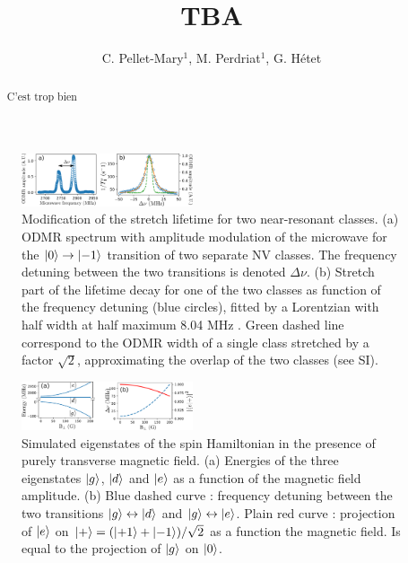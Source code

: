 \documentclass[preprintnumbers,amsmath,amssymb,superscriptaddress,twocolumn,showpacs]{revtex4-1}
\begin{document}
\title{TBA}

\author{C. Pellet-Mary$^1$, M. Perdriat$^1$, G. H\'etet} 


\begin{abstract}
C'est trop bien
\end{abstract}

\maketitle

\begin{figure}
\includegraphics[width=0.45\textwidth]{Figures/fig largeur fluct}
\caption{Modification of the stretch lifetime for two near-resonant classes. (a) ODMR spectrum with amplitude modulation of the microwave for the $\ket{0} \to \ket{-1}$ transition of two separate NV classes. The frequency detuning between the two transitions is denoted $\Delta \nu$. (b) Stretch part of the lifetime decay for one of the two classes as function of the frequency detuning (blue circles), fitted by a Lorentzian with half width at half maximum 8.04 MHz . Green dashed line correspond to the ODMR width of a single class stretched by a factor $\sqrt 2$, approximating the overlap of the two classes (see SI).}
\end{figure}

\begin{figure}
\includegraphics[width=0.45\textwidth]{Figures/fig transverse field simu}
\caption{Simulated eigenstates of the spin Hamiltonian in the presence of purely transverse magnetic field. (a) Energies of the three eigenstates $\ket{g}$, $\ket{d}$ and $\ket{e}$ as a function of the magnetic field amplitude. (b) Blue dashed curve : frequency detuning between the two transitions $\ket{g} \leftrightarrow \ket{d}$ and $\ket{g} \leftrightarrow \ket{e}$. Plain red curve : projection of $\ket{e}$ on $\ket{+}=(\ket{+1}+\ket{-1})/\sqrt{2}$ as a function the magnetic field. Is equal to the projection of $\ket{g}$ on $\ket{0}$.}
\end{figure}
\end{document}

